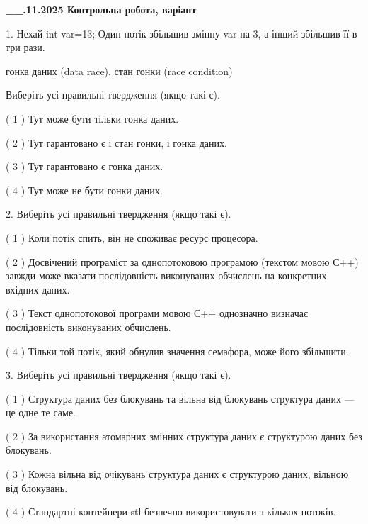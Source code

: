 \documentclass[12pt, ukrainian]{article}
\begin{document}
\newpage
\begin {large}

\textbf{\_\_.11.2025 Контрольна робота, варіант  }\par


{
1. Нехай int var=13; Один потік збільшив змінну var на 3, а інший збільшив її в три рази.

гонка даних (data race), стан гонки (race condition)

Виберіть усі правильні твердження (якщо такі є).\par
\vspace{2mm}
( 1 ) Тут може бути тільки гонка даних.%

( 2 ) Тут гарантовано є і стан гонки, і гонка даних.%

( 3 ) Тут гарантовано є гонка даних.%

( 4 ) Тут може не бути гонки даних.%


2. Виберіть усі правильні твердження (якщо такі є).\par
\vspace{2mm}

( 1 ) Коли потік спить, він не споживає ресурс процесора.%

( 2 ) Досвічений програміст за однопотоковою програмою (текстом мовою С++) завжди може вказати послідовність виконуваних обчислень на конкретних вхідних даних.%

( 3 ) Текст однопотокової програми мовою С++ однозначно визначає послідовність виконуваних обчислень.%

( 4 ) Тільки той потік, який обнулив значення семафора, може його збільшити.%


3. Виберіть усі правильні твердження (якщо такі є).\par
\vspace{2mm}

( 1 ) Структура даних без блокувань та вільна від блокувань структура даних --- це одне те саме.%

( 2 ) За використання атомарних змінних структура даних є структурою даних без блокувань.%

( 3 ) Кожна вільна від очікувань структура даних є структурою даних, вільною від блокувань.%

( 4 ) Стандартні контейнери stl безпечно використовувати з кількох потоків.%


}
\end{large}
\end{document}
